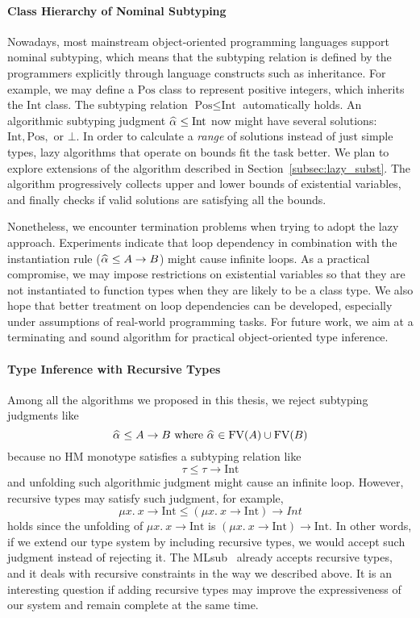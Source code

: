 \paragraph{Class Hierarchy of Nominal Subtyping}
Nowadays, most mainstream object-oriented programming languages
support nominal subtyping,
which means that the subtyping relation is defined by the programmers explicitly
through language constructs such as inheritance.
For example, we may define a $\text{Pos}$ class to represent positive integers,
which inherits the $\text{Int}$ class.
The subtyping relation $\text{Pos} \le \text{Int}$ automatically holds.
An algorithmic subtyping judgment $\al \le \text{Int}$
now might have several solutions: $\text{Int}, \text{Pos},$ or $\bot$.
In order to calculate a \emph{range} of solutions instead of
just simple types,
lazy algorithms that operate on bounds fit the task better.
We plan to explore extensions of the algorithm described in Section~\ref{subsec:lazy_subst}.
The algorithm progressively collects upper and lower bounds of existential variables,
and finally checks if valid solutions are satisfying all the bounds.

Nonetheless, we encounter termination problems when trying to adopt the lazy approach.
Experiments indicate that loop dependency in combination with the
instantiation rule ($\al \le A \to B$) might cause infinite loops.
As a practical compromise,
we may impose restrictions on existential variables
so that they are not instantiated to function types
when they are likely to be a class type.
We also hope that better treatment on loop dependencies can be
developed, especially under assumptions of real-world programming tasks.
For future work,
we aim at a terminating and sound algorithm for practical object-oriented type inference.


\paragraph{Type Inference with Recursive Types}
Among all the algorithms we proposed in this thesis,
we reject subtyping judgments like
$$\al \le A \to B \text{ where } \al \in \text{FV}(A) \cup \text{FV}(B)$$
because no HM monotype satisfies a subtyping relation like
$$\tau \le \tau \to \text{Int}$$
and unfolding such algorithmic judgment might cause an infinite loop.
However, recursive types may satisfy such judgment, for example,
$$\mu x.~x \to \text{Int} \le (\mu x.~x \to \text{Int}) \to Int$$
holds since the unfolding of $\mu x.~x \to \text{Int}$
is $(\mu x.~x \to \text{Int}) \to \text{Int}$.
In other words, if we extend our type system by including recursive types,
we would accept such judgment instead of rejecting it.
The MLsub~\citep{mlsub} already accepts recursive types,
and it deals with recursive constraints in the way we described above.
It is an interesting question
if adding recursive types may improve the expressiveness
of our system and remain complete at the same time.

